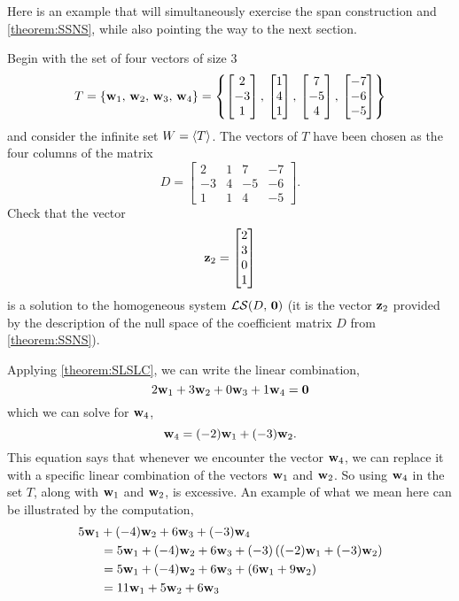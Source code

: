 \documentclass{ximera}
\begin{document}
Here is an example that will simultaneously exercise the span
construction and \ref{theorem:SSNS}, while also pointing the way to
the next section.

\begin{example}
  Begin with the set of four vectors of size $3$
  \[
    T=\left\{\mathbf{w}_1,\,\mathbf{w}_2,\,\mathbf{w}_3,\,\mathbf{w}_4\right\}
    =\left\{
      \begin{bmatrix}2\\-3\\1\end{bmatrix},\,
      \begin{bmatrix}1\\4\\1\end{bmatrix},\,
      \begin{bmatrix}7\\-5\\4\end{bmatrix},\,
      \begin{bmatrix}-7\\-6\\-5\end{bmatrix}
    \right\}
  \]
  and consider the infinite set $W=\left\langle T\right\rangle$.  The vectors of $T$ have
  been chosen as the four columns of the matrix
  \[
    D = \begin{bmatrix}
      2 & 1 & 7 & -7 \\
      -3 & 4 &  -5 & -6 \\
      1 & 1 & 4 &  -5 
    \end{bmatrix}.
  \]
  Check that the vector
  \[
    \mathbf{z}_2=\begin{bmatrix}2\\3\\0\\1\end{bmatrix}
  \]
  is a solution to the homogeneous system $\mathcal{LS}\!\left(D,\,\mathbf{0}\right)$ (it is the
  vector $\mathbf{z}_2$ provided by the description of the null space of
  the coefficient matrix $D$ from \ref{theorem:SSNS}).

  Applying \ref{theorem:SLSLC}, we can write the linear combination,
  \[
    2\mathbf{w}_1+3\mathbf{w}_2+0\mathbf{w}_3+1\mathbf{w}_4=\mathbf{0}
  \]
  which we can solve for $\mathbf{w}_4$,
  \[
    \mathbf{w}_4=(-2)\mathbf{w}_1+(-3)\mathbf{w}_2.
  \]
  This equation says that whenever we encounter the vector
  $\mathbf{w}_4$, we can replace it with a specific linear combination
  of the vectors $\mathbf{w}_1$ and $\mathbf{w}_2$.  So using $\mathbf{w}_4$
  in the set $T$, along with $\mathbf{w}_1$ and $\mathbf{w}_2$, is
  excessive.  An example of what we mean here can be illustrated by
  the computation,
  \begin{align*}
    5\mathbf{w}_1&+(-4)\mathbf{w}_2+6\mathbf{w}_3+(-3)\mathbf{w}_4\\
               &=5\mathbf{w}_1+(-4)\mathbf{w}_2+6\mathbf{w}_3+(-3)\left((-2)\mathbf{w}_1+(-3)\mathbf{w}_2\right)\\
               &=5\mathbf{w}_1+(-4)\mathbf{w}_2+6\mathbf{w}_3+\left(6\mathbf{w}_1+9\mathbf{w}_2\right)\\
               &=11\mathbf{w}_1+5\mathbf{w}_2+6\mathbf{w}_3
  \end{align*}
  

\end{example}
\end{document}
